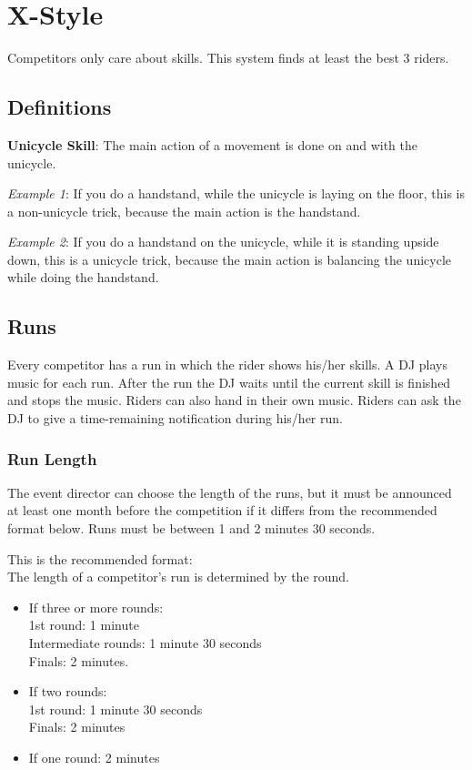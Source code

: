 \chapter{X-Style}
Competitors only care about skills.
This system finds at least the best 3 riders.

\section{Definitions}
\textbf{Unicycle Skill}: The main action of a movement is done on and with the unicycle.

\emph{Example 1}: If you do a handstand, while the unicycle is laying on the floor, this is a non-unicycle trick, because the main action is the handstand.

\emph{Example 2}: If you do a handstand on the unicycle, while it is standing upside down, this is a unicycle trick, because the main action is balancing the unicycle while doing the handstand.

\section{Runs}
Every competitor has a run in which the rider shows his/her skills.
A DJ plays music for each run.
After the run the DJ waits until the current skill is finished and stops the music.
Riders can also hand in their own music.
Riders can ask the DJ to give a time-remaining notification during his/her run.

\subsection{Run Length}
The event director can choose the length of the runs, but it must be announced at least one month before the competition if it differs from the recommended format below.
Runs must be between 1 and 2 minutes 30 seconds.

This is the recommended format: \\
The length of a competitor's run is determined by the round.
\begin{itemize}
\item If three or more rounds: \\
1st round: 1 minute \\
Intermediate rounds: 1 minute 30 seconds \\
Finals: 2 minutes.
\item If two rounds: \\
1st round: 1 minute 30 seconds \\
Finals: 2 minutes
\item If one round: 2 minutes
\end{itemize}

